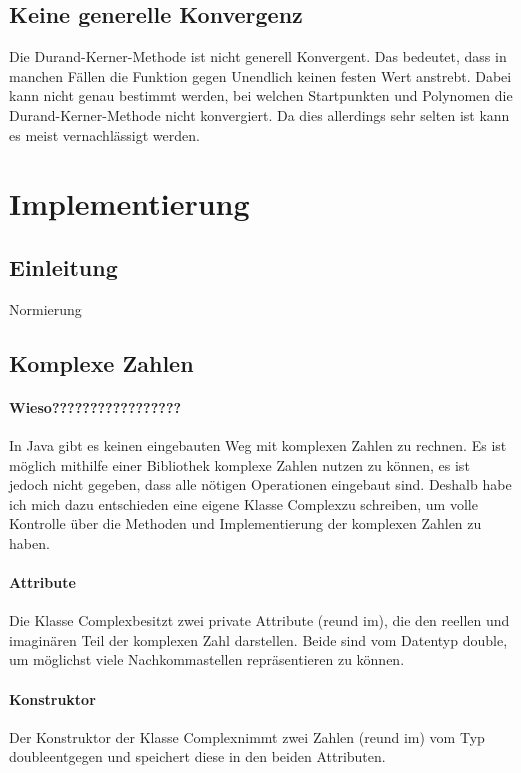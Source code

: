\documentclass[12pt]{article}
\begin{document}
\subsection{Keine generelle Konvergenz}
Die Durand-Kerner-Methode ist nicht generell Konvergent. Das bedeutet, dass in manchen Fällen die Funktion gegen Unendlich keinen festen Wert anstrebt. Dabei kann nicht genau bestimmt werden, bei welchen Startpunkten und Polynomen die Durand-Kerner-Methode nicht konvergiert. Da dies allerdings sehr selten ist kann es meist vernachlässigt werden.

\section{Implementierung}
\subsection{Einleitung}
Normierung
\subsection{Komplexe Zahlen}
\paragraph{Wieso?????????????????}
In Java gibt es keinen eingebauten Weg mit komplexen Zahlen zu rechnen. Es ist möglich mithilfe einer Bibliothek komplexe Zahlen nutzen zu können, es ist jedoch nicht gegeben, dass alle nötigen Operationen eingebaut sind. Deshalb habe ich mich dazu entschieden eine eigene Klasse \glqq Complex\grqq zu schreiben, um volle Kontrolle über die Methoden und Implementierung der komplexen Zahlen zu haben.

\paragraph{Attribute}
Die Klasse \glqq Complex\grqq besitzt zwei private Attribute (\glqq re\grqq \space und \glqq im\grqq), die den reellen und imaginären Teil der komplexen Zahl darstellen. Beide sind vom Datentyp \glqq double\grqq, um möglichst viele Nachkommastellen repräsentieren zu können.

\paragraph{Konstruktor}
Der Konstruktor der Klasse \glqq Complex\grqq\space nimmt zwei Zahlen (\glqq re\grqq \space und \glqq im\grqq) vom Typ \glqq double\grqq\space entgegen und speichert diese in den beiden Attributen.
\end{document}
